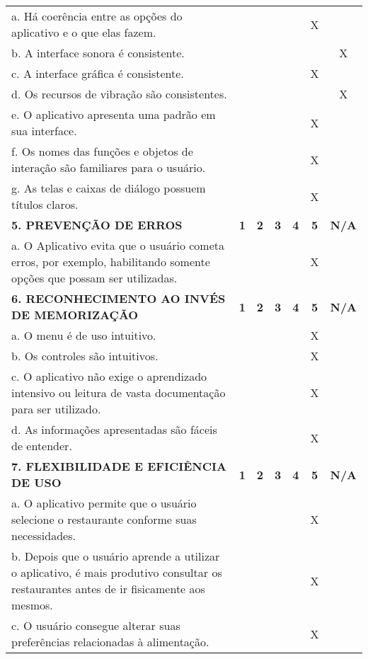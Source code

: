 \documentclass[portuguese,oneside]{tcc}
\begin{document}
\begin{center}
\begin{longtabu}{|L{25em}|c|c|c|c|c|c|}
			a. Há coerência entre as opções do aplicativo e o que elas fazem. & & & & & X & \\ 
			b. A interface sonora é consistente. & & & & & & X \\ 
			c. A interface gráfica é consistente. & & & & & X & \\ 
			d. Os recursos de vibração são consistentes. & & & & & & X \\ 
			e. O aplicativo apresenta uma padrão em sua interface. & & & & & X & \\ 
			f. Os nomes das funções e objetos de interação são familiares para o usuário. & & & & & X & \\ 
			g. As telas e caixas de diálogo possuem títulos claros. & & & & & X & \\ 
			\textbf{5. PREVENÇÃO DE ERROS} & \textbf{1} & \textbf{2} & \textbf{3} & \textbf{4} & \textbf{5} & \textbf{N/A} \\ 
			a. O Aplicativo evita que o usuário cometa erros, por exemplo, habilitando somente opções que possam ser utilizadas. & & & & & X & \\ 
			\textbf{6. RECONHECIMENTO AO INVÉS DE MEMORIZAÇÃO} & \textbf{1} & \textbf{2} & \textbf{3} & \textbf{4} & \textbf{5} & \textbf{N/A} \\ 
			a. O  menu é de uso intuitivo. & & & & & X & \\ 
			b. Os controles são intuitivos. & & & & & X & \\ 
			c. O aplicativo não exige o aprendizado intensivo ou leitura de vasta documentação para ser utilizado. & & & & & X & \\ 
			d. As informações apresentadas são fáceis de entender. & & & & & X & \\ 
			\textbf{7. FLEXIBILIDADE E EFICIÊNCIA DE USO} & \textbf{1} & \textbf{2} & \textbf{3} & \textbf{4} & \textbf{5} & \textbf{N/A} \\ 
			a. O aplicativo permite que o usuário selecione o restaurante conforme suas necessidades. & & & & & X & \\ 
			b. Depois que o usuário aprende a utilizar o aplicativo, é mais produtivo consultar os restaurantes antes de ir fisicamente aos mesmos. & & & & & X & \\ 
			c. O usuário consegue alterar suas preferências relacionadas à alimentação. & & & & & X & \\ 

\end{longtabu}
\end{center}
\end{document}
